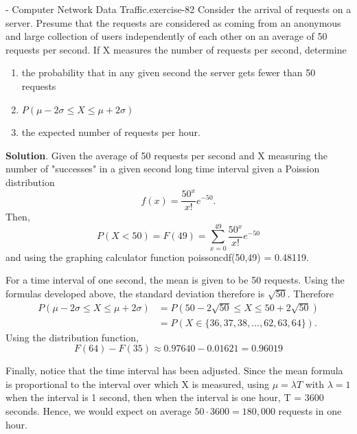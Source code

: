 \documentclass[10pt,]{book}
\numberwithin{equation}{section}
\newcommand{\lt}{<}
\begin{document}
\begin{inlineexercise}{- Computer Network Data Traffic.}{exercise-82}%
\hypertarget{p-1168}{}%
Consider the arrival of requests on a server. Presume that the requests are considered as coming from an anonymous and large collection of users independently of each other on an average of 50 requests per second. If X measures the number of requests per second, determine \leavevmode%
\begin{enumerate}
\item\hypertarget{li-306}{}the probability that in any given second the server gets fewer than 50 requests%
\item\hypertarget{li-307}{}\(P(\mu - 2\sigma \le X \le \mu + 2\sigma)\)%
\item\hypertarget{li-308}{}the expected number of requests per hour.%
\end{enumerate}
 \textbf{Solution}.\quad%
\hypertarget{p-1169}{}%
Given the average of 50 requests per second and X measuring the number of "successes" in a given second long time interval given a Poission distribution%
\begin{equation*}
f(x) = \frac{50^x}{x!}e^{-50}.
\end{equation*}
Then,%
\begin{equation*}
P(X \lt 50) = F(49) = \sum_{x=0}^{49} \frac{50^x}{x!} e^{-50}
\end{equation*}
and using the graphing calculator function poissoncdf(50,49) = 0.48119.%
\par
\hypertarget{p-1170}{}%
For a time interval of one second, the mean is given to be 50 requests. Using the formulas developed above, the standard deviation therefore is \(\sqrt{50}\). Therefore%
\begin{align*}
P(\mu - 2\sigma \le X \le \mu + 2\sigma) & = P(50 - 2\sqrt{50} \le X \le 50 + 2\sqrt{50})\\
& = P(X \in \{ 36, 37, 38, ..., 62, 63, 64 \}).
\end{align*}
Using the distribution function,%
\begin{equation*}
F(64) - F(35) \approx 0.97640 - 0.01621 = 0.96019
\end{equation*}
%
\par
\hypertarget{p-1171}{}%
Finally, notice that the time interval has been adjusted. Since the mean formula is proportional to the interval over which X is measured, using \(\mu = \lambda T\) with \(\lambda = 1\) when the interval is 1 second, then when the interval is one hour, T = 3600 seconds. Hence, we would expect on average \(50 \cdot 3600 = 180,000\) requests in one hour.%
%
\end{inlineexercise}
%
%
%
\typeout{************************************************}
\typeout{************************************************}
%
\end{document}
